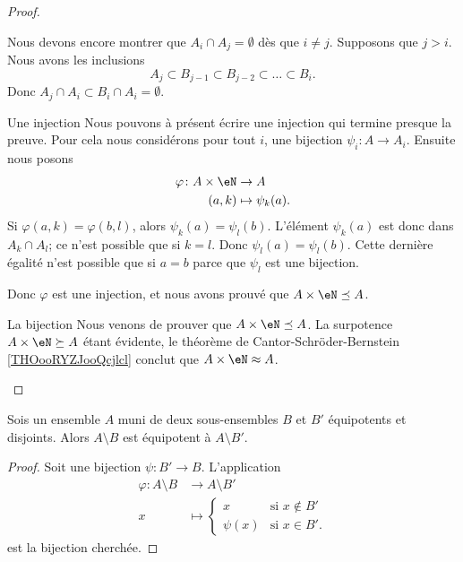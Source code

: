 \begin{proof}
\begin{subproof}
            Nous devons encore montrer que \( A_i\cap A_j=\emptyset\) dès que \( i\neq j\). Supposons que \( j>i\). Nous avons les inclusions
            \begin{equation}
                A_j\subset B_{j-1}\subset B_{j-2}\subset \ldots \subset B_i.
            \end{equation}
            Donc \( A_j\cap A_i\subset B_i\cap A_i=\emptyset\).
        \item[Une injection]
            Nous pouvons à présent écrire une injection qui termine presque la preuve. Pour cela nous considérons pour tout \( i\), une bijection \( \psi_i\colon A\to A_i\). Ensuite nous posons
            \begin{equation}
                \begin{aligned}
                    \varphi\colon A\times \eN&\to A \\
                    (a,k)&\mapsto \psi_k(a). 
                \end{aligned}
            \end{equation}
                Si \( \varphi(a,k)=\varphi(b,l)\), alors \( \psi_k(a)=\psi_l(b)\). L'élément \( \psi_k(a)\) est donc dans \( A_k\cap A_l\); ce n'est possible que si \( k=l\). Donc \( \psi_l(a)=\psi_l(b)\). Cette dernière égalité n'est possible que si \( a=b\) parce que \( \psi_l\) est une bijection.
            
                Donc \( \varphi\) est une injection, et nous avons prouvé que \( A\times \eN\preceq A\).
            \item[La bijection]
                Nous venons de prouver que \( A\times \eN\preceq A\). La surpotence \( A\times \eN\succeq A\) étant évidente, le théorème de Cantor-Schröder-Bernstein \ref{THOooRYZJooQcjlcl} conclut que \( A\times \eN\approx A\).
    \end{subproof}
\end{proof}

\begin{lemma}        \label{LEMooDHWSooFqhano}
    Sois un ensemble \( A\) muni de deux sous-ensembles \( B\) et \( B'\) équipotents et disjoints. Alors \( A\setminus B\) est équipotent à \( A\setminus B'\).
\end{lemma}

\begin{proof}
    Soit une bijection \( \psi\colon B'\to B\). L'application
    \begin{equation}
        \begin{aligned}
            \varphi\colon A\setminus B&\to A\setminus B' \\
            x&\mapsto \begin{cases}
                x    &   \text{si } x\notin B'\\
                \psi(x)    &    \text{si } x\in B'.
            \end{cases}
        \end{aligned}
    \end{equation}
    est la bijection cherchée.
\end{proof}

